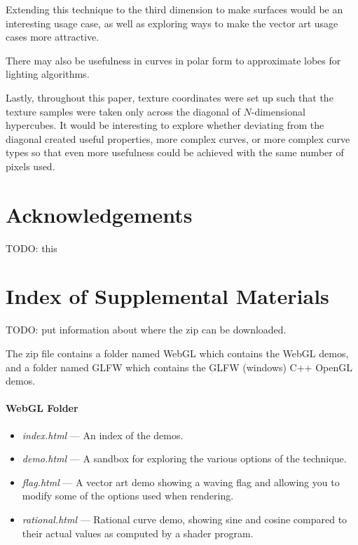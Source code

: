 \documentclass{jcgt}
\begin{document}
Extending this technique to the third dimension to make surfaces would be an interesting usage case, as well as exploring ways to make the vector art usage cases more attractive.

There may also be usefulness in curves in polar form to approximate lobes for lighting algorithms.

Lastly, throughout this paper, texture coordinates were set up such that the texture samples were taken only across the diagonal of $N$-dimensional hypercubes.  It would be interesting to explore whether deviating from the diagonal created useful properties, more complex curves, or more complex curve types so that even more usefulness could be achieved with the same number of pixels used.

\section*{Acknowledgements}
\label{sec:acknowledgements}
TODO: this

\small



\section*{Index of Supplemental Materials}
\label{sec:indexofsupplementalmaterials}
TODO: put information about where the zip can be downloaded.

The zip file contains a folder named WebGL which contains the WebGL demos, and a folder named GLFW which contains the GLFW (windows) C++ OpenGL demos.

\paragraph{\textbf{WebGL Folder}}
\begin{itemize}
  \item \textit{index.html} --- An index of the demos.
  \item \textit{demo.html} --- A sandbox for exploring the various options of the technique.
  \item \textit{flag.html} --- A vector art demo showing a waving flag and allowing you to modify some of the options used when rendering.
  \item \textit{rational.html} --- Rational curve demo, showing sine and cosine compared to their actual values as computed by a shader program.
\end{itemize}
\end{document}
